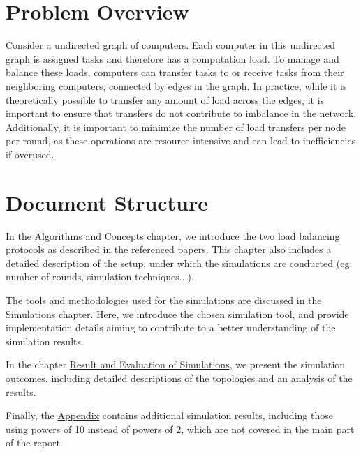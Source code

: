 \section{Problem Overview}
Consider a undirected graph of computers. Each computer in this undirected graph is assigned tasks and therefore has a computation load. To manage and balance these loads, computers can transfer tasks to or receive tasks from their neighboring computers, connected by edges in the graph.
In practice, while it is theoretically possible to transfer any amount of load across the edges, it is important to ensure that transfers do not contribute to imbalance in the network. Additionally, it is important to minimize the number of load transfers per node per round, as these operations are resource-intensive and can lead to inefficiencies if overused.

\section{Document Structure}
In the \hyperref[chap:background]{{\color{blue}}Algorithms and Concepts} chapter, we introduce the two load balancing protocols as described in the referenced papers. This chapter also includes a detailed description of the setup, under which the simulations are conducted (eg. number of rounds, simulation techniques...).

The tools and methodologies used for the simulations are discussed in the \hyperref[chap:simulations]{Simulations} chapter. Here, we introduce the chosen simulation tool, and provide implementation details aiming to contribute to a better understanding of the simulation results.

In the chapter \hyperref[chap:results]{Result and Evaluation of Simulations}, we present the simulation outcomes, including detailed descriptions of the topologies and an analysis of the results.

Finally, the \hyperref[chap:appendix]{Appendix} contains additional simulation results, including those using powers of 10 instead of powers of 2, which are not covered in the main part of the report.
